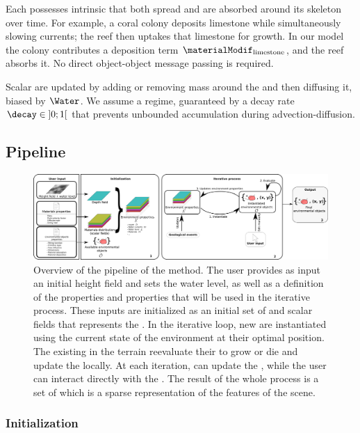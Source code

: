 Each  possesses intrinsic  that both spread and are absorbed around its skeleton over time. For example, a coral colony deposits limestone while simultaneously slowing currents; the reef then uptakes that limestone for growth.  
In our model the colony contributes a deposition term $\materialModif_{\text{limestone}}$, and the reef absorbs it. No direct object-object message passing is required.

Scalar  are updated by adding or removing mass around the  and then diffusing it, biased by $\Water$. 
We assume a  regime, guaranteed by a decay rate~$\decay \in\;]0; 1[$ that prevents unbounded accumulation during advection-diffusion.

\subsection{Pipeline}

\begin{figure}[H]
    \includegraphics{pipeline.pdf}
    \caption{Overview of the pipeline of the method. The user provides as input an initial height field and sets the water level, as well as a definition of the  properties and  properties that will be used in the iterative process. These inputs are initialized as an initial set of  and scalar fields that represents the . In the iterative loop, new  are instantiated using the current state of the environment at their optimal position. The existing  in the terrain reevaluate their  to grow or die and update the  locally. At each iteration,  can update the , while the user can interact directly with the . The result of the whole process is a set of  which is a sparse representation of the features of the scene. }
    \label{fig:env-obj-pipeline}
\end{figure}

\subsubsection{Initialization}

